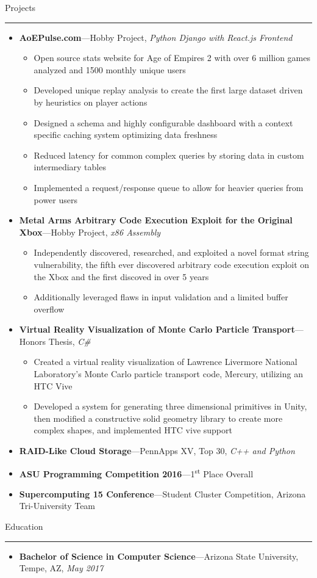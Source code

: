 \documentclass[10pt,oneside]{article}
\newcommand{\sectitle}[1]{
  \begin{flushleft}{\selectfont\Large#1}\end{flushleft}
}
\newenvironment{ressection}[1]{
  \vspace{2pt}
  \sectitle{#1}
  \vspace{-10pt}\rule{\textwidth}{0.5pt}
  \vspace{-10pt}
  \begin{itemize}[leftmargin=13pt]
  \vspace{3pt}
}{
  \end{itemize}
}
\newcommand{\ressubitem}[1]{
  \vspace{-1pt}
  \item \begin{flushleft} #1 \end{flushleft}
}
\newcommand{\resmeditem}[2]{
  \vspace{-5pt}
  \item
  \textbf{#1}---#2
}
\newcommand{\resbigitemline}[3]{
  \vspace{-5pt}
  \item
  \textbf{#1}---#2, 
  \textit{#3}
}
\newenvironment{ressubsecline}[3]{
  \resbigitemline{#1}{#2}{#3}
  \vspace{-2pt}
  \begin{itemize}
}{
  \end{itemize}
}
\begin{document}
\begin{ressection}{Projects}
  \begin{ressubsecline}{AoEPulse.com}{Hobby Project}{Python Django with React.js Frontend}
    \ressubitem{Open source stats website for Age of Empires 2 with over 6 million games analyzed and 1500 monthly unique users}
    \ressubitem{Developed unique replay analysis to create the first large dataset driven by heuristics on player actions}
    \ressubitem{Designed a schema and highly configurable dashboard with a context specific caching system optimizing data freshness}
    \ressubitem{Reduced latency for common complex queries by storing data in custom intermediary tables}
    \ressubitem{Implemented a request/response queue to allow for heavier queries from power users}
  \end{ressubsecline}
  \begin{ressubsecline}{Metal Arms Arbitrary Code Execution Exploit for the Original Xbox}{Hobby Project}{x86 Assembly}
    \ressubitem{Independently discovered, researched, and exploited a novel format string vulnerability, the fifth ever discovered arbitrary code execution exploit on the Xbox and the first discoved in over 5 years}
    \ressubitem{Additionally leveraged flaws in input validation and a limited buffer overflow}
  \end{ressubsecline}
  \begin{ressubsecline}{Virtual Reality Visualization of Monte Carlo Particle Transport}{Honors Thesis}{C\#}
    \ressubitem{Created a virtual reality visualization of Lawrence Livermore National Laboratory's Monte Carlo particle transport code, Mercury, utilizing an HTC Vive}
    \ressubitem{Developed a system for generating three dimensional primitives in Unity, then modified a constructive solid geometry library to create more complex shapes, and implemented HTC vive support}
  \end{ressubsecline}
  \resbigitemline{RAID-Like Cloud Storage}{PennApps XV, Top 30}{C++ and Python}
  \resmeditem{ASU Programming Competition 2016}{1\textsuperscript{st} Place Overall}
  \resmeditem{Supercomputing 15 Conference}{Student Cluster Competition,}{Arizona Tri-University Team}

\end{ressection}

\vspace{\baselineskip}
\begin{ressection}{Education}
  \resbigitemline{Bachelor of Science in Computer Science}{Arizona State University, Tempe, AZ}{May 2017}
\end{ressection}
\end{document}
